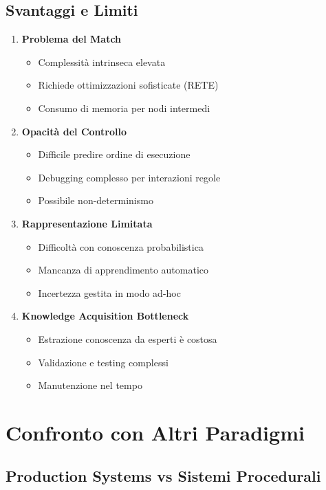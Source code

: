 \subsection{Svantaggi e Limiti}

\begin{enumerate}
\item \textbf{Problema del Match}
\begin{itemize}
\item Complessità intrinseca elevata
\item Richiede ottimizzazioni sofisticate (RETE)
\item Consumo di memoria per nodi intermedi
\end{itemize}

\item \textbf{Opacità del Controllo}
\begin{itemize}
\item Difficile predire ordine di esecuzione
\item Debugging complesso per interazioni regole
\item Possibile non-determinismo
\end{itemize}

\item \textbf{Rappresentazione Limitata}
\begin{itemize}
\item Difficoltà con conoscenza probabilistica
\item Mancanza di apprendimento automatico
\item Incertezza gestita in modo ad-hoc
\end{itemize}

\item \textbf{Knowledge Acquisition Bottleneck}
\begin{itemize}
\item Estrazione conoscenza da esperti è costosa
\item Validazione e testing complessi
\item Manutenzione nel tempo
\end{itemize}
\end{enumerate}

\section{Confronto con Altri Paradigmi}

\subsection{Production Systems vs Sistemi Procedurali}

